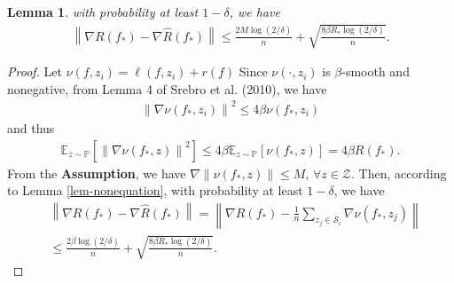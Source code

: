 \documentclass{article}
\newtheorem{lemma}{Lemma}
\begin{document}
\begin{lemma}
  with probability at least $1-\delta$, we have
  \begin{align}
  \label{equation-nablaR-nablaempR}
    \left\|\nabla R(f_\ast)-\nabla \hat{R}(f_\ast)\right\|\leq \frac{2M\log(2/\delta)}{n}+\sqrt{\frac{8\beta R_\ast\log(2/\delta)}{n}}.
  \end{align}
\end{lemma}
\begin{proof}
Let $\nu(f,z_i)=\ell(f,z_i)+r(f)$
  Since $\nu(\cdot,z_i)$ is $\beta$-smooth and nonegative,
  from Lemma 4 of Srebro et al. (2010), we have
  \begin{align*}
    \left\|\nabla \nu(f_\ast,z_i)\right\|^2\leq 4\beta \nu(f_\ast,z_i)
  \end{align*}
  and thus
    \begin{align*}
      \mathbb{E}_{z\sim\mathbb{P}}\left[\left\|\nabla \nu(f_\ast,z)\right\|^2\right]\leq 4\beta\mathbb{E}_{z\sim\mathbb{P}}[\nu(f_\ast,z)]=
      4\beta R(f_\ast).
    \end{align*}
    From the \textbf{Assumption}, we have $\nabla \|\nu(f_\ast, z)\|\leq M$, $\forall z\in\mathcal{Z}$.
    Then, according to Lemma \ref{lem-nonequation}, with probability at least $1-\delta$, we have
    \begin{align*}
      &\left\|\nabla R(f_\ast)-\nabla \hat{R}(f_\ast)\right\|=\left\|\nabla R(f_\ast)-\frac{1}{n}\sum_{z_j\in\mathcal{S}_i}\nabla \nu(f_\ast,z_j)\right\|\\
      &\leq \frac{2\beta \log(2/\delta)}{n}+\sqrt{\frac{8\beta R_\ast \log(2/\delta)}{n}}.
    \end{align*}
\end{proof}
\end{document}
